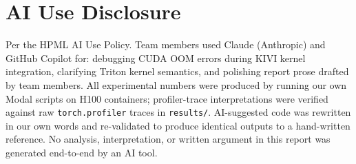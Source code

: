 \documentclass[conference]{IEEEtran}
\begin{document}
\appendix
\section*{AI Use Disclosure}

Per the HPML AI Use Policy.  Team members used Claude (Anthropic) and
GitHub Copilot for: debugging CUDA OOM errors during KIVI kernel
integration, clarifying Triton kernel semantics, and polishing report
prose drafted by team members.  All experimental numbers were produced
by running our own Modal scripts on H100 containers; profiler-trace
interpretations were verified against raw \texttt{torch.profiler}
traces in \texttt{results/}.  AI-suggested code was rewritten in our
own words and re-validated to produce identical outputs to a hand-written
reference.  No analysis, interpretation, or written argument in this
report was generated end-to-end by an AI tool.


\end{document}
